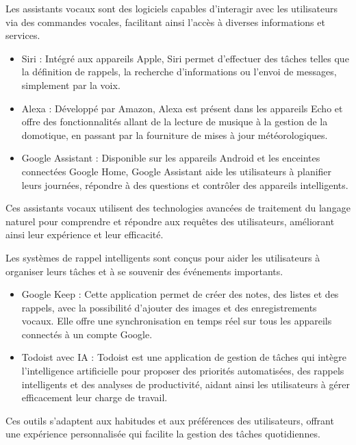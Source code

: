 \documentclass[12pt,a4paper]{report}
\begin{document}
Les assistants vocaux sont des logiciels capables d'interagir avec les utilisateurs via des commandes vocales, facilitant ainsi l'accès à diverses informations et services.

\begin{itemize}
    \item Siri : Intégré aux appareils Apple, Siri permet d'effectuer des tâches telles que la définition de rappels, la recherche d'informations ou l'envoi de messages, simplement par la voix.

    \item Alexa : Développé par Amazon, Alexa est présent dans les appareils Echo et offre des fonctionnalités allant de la lecture de musique à la gestion de la domotique, en passant par la fourniture de mises à jour météorologiques.

    \item Google Assistant : Disponible sur les appareils Android et les enceintes connectées Google Home, Google Assistant aide les utilisateurs à planifier leurs journées, répondre à des questions et contrôler des appareils intelligents.
\end{itemize}

Ces assistants vocaux utilisent des technologies avancées de traitement du langage naturel pour comprendre et répondre aux requêtes des utilisateurs, améliorant ainsi leur expérience et leur efficacité.

Les systèmes de rappel intelligents sont conçus pour aider les utilisateurs à organiser leurs tâches et à se souvenir des événements importants.

\begin{itemize}
    \item Google Keep : Cette application permet de créer des notes, des listes et des rappels, avec la possibilité d'ajouter des images et des enregistrements vocaux. Elle offre une synchronisation en temps réel sur tous les appareils connectés à un compte Google.
    
    \item Todoist avec IA : Todoist est une application de gestion de tâches qui intègre l'intelligence artificielle pour proposer des priorités automatisées, des rappels intelligents et des analyses de productivité, aidant ainsi les utilisateurs à gérer efficacement leur charge de travail.
    
\end{itemize}

Ces outils s'adaptent aux habitudes et aux préférences des utilisateurs, offrant une expérience personnalisée qui facilite la gestion des tâches quotidiennes.
\end{document}
